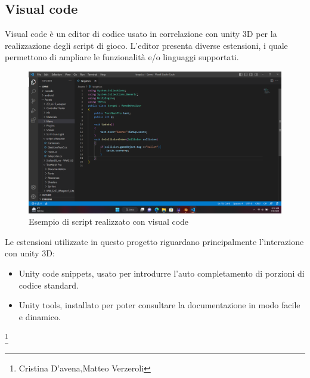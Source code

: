 \documentclass[10pt,a4paper]{article}
\begin{document}
	\subsection{Visual code}
	Visual code è un editor di codice usato in correlazione con unity 3D per la realizzazione degli script di gioco.
	L'editor presenta diverse estensioni, i quale permettono di ampliare le funzionalità e/o linguaggi supportati.
	 \begin{figure}[H]
		\centering
		\includegraphics[width=0.7\linewidth]{image/visual_code}
		\caption{Esempio di script realizzato con visual code}
		\label{fig:visual_code}
	\end{figure}
    Le estensioni utilizzate in questo progetto riguardano principalmente l'interazione con unity 3D:
    \begin{itemize}
    	\item Unity code snippets, usato per introdurre l'auto completamento di porzioni di codice standard.
    	\item Unity tools, installato per poter consultare la documentazione in modo facile e dinamico. 
    \end{itemize}
    \newpage
    \null
    \newpage
	\thanks{Cristina D'avena,Matteo Verzeroli }
\end{document}
